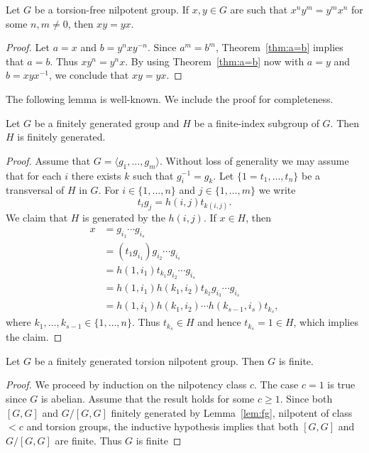 \begin{corollary}
	Let $G$ be a torsion-free nilpotent group. If $x,y\in G$ are such that 
	$x^ny^m=y^mx^n$ for some $n,m\ne 0$, then $xy=yx$.
\end{corollary}

\begin{proof}
	Let $a=x$ and $b=y^nxy^{-n}$. Since $a^m=b^m$, Theorem~\ref{thm:a=b} implies that $a=b$. Thus $xy^n=y^nx$. 
	By using Theorem~\ref{thm:a=b} now with $a=y$ and $b=xyx^{-1}$, we conclude that 
	$xy=yx$. 
\end{proof}

The following lemma is well-known. We include the proof for completeness. 

\begin{lemma}
	\label{lem:fg}
	Let $G$ be a finitely generated group and $H$ be a finite-index subgroup of $G$. 
	Then $H$ is finitely generated. 
\end{lemma}

\begin{proof}
	Assume that $G=\langle g_1,\dots,g_m\rangle$. Without loss of generality we may assume that 
	for each $i$ there exists $k$ such that $g_i^{-1}=g_k$. 
	Let $\{1=t_1,\dots,t_n\}$ be a transversal of $H$ in $G$. For 
	$i\in\{1,\dots,n\}$ and 
	$j\in\{1,\dots,m\}$ we write 
	\[
		t_ig_j=h(i,j)t_{k(i,j)}.
	\]
	We claim that $H$ is generated by the $h(i,j)$. If $x\in H$, then 
	\begin{align*}
	x &=g_{i_1}\cdots g_{i_s}\\
	&= (t_1g_{i_1})g_{i_2}\cdots g_{i_s}\\
	&= h(1,i_1)t_{k_1}g_{i_2}\cdots g_{i_s}\\
	&= h(1,i_1)h(k_1,i_2)t_{k_2}g_{i_3}\cdots g_{i_s}\\
	&= h(1,i_1)h(k_1,i_2)\cdots h(k_{s-1},i_s)t_{k_s},
	\end{align*}
	where $k_1,\dots,k_{s-1}\in\{1,\dots,n\}$. Thus $t_{k_s}\in H$ and hence 
	$t_{k_s}=1\in H$, which implies the claim.  
\end{proof}

\begin{theorem}
	\label{thm:T(G)finito}
	Let $G$ be a finitely generated torsion nilpotent group. Then
	$G$ is finite.  	
\end{theorem}

\begin{proof}
	We proceed by induction on the nilpotency class $c$. The case $c=1$ is true since $G$ is abelian. Assume 
	that the result holds for some $c\geq1$.  Since both $[G,G]$ and $G/[G,G]$ 
	finitely generated by Lemma~\ref{lem:fg}, 
	nilpotent of class 
	$<c$ and torsion groups, the inductive hypothesis implies that both $[G,G]$ and $G/[G,G]$ are finite. Thus $G$
	is finite
\end{proof}

